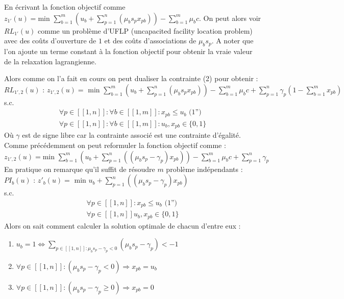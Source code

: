 \documentclass{article}
\begin{document}
En écrivant la fonction objectif comme  $z_{1'}(u) = \text{min } \sum \limits_{b = 1}^{m}( u_b + \sum \limits_{p = 1}^n (\mu_b s_p x_{pb})) - \sum \limits_{b = 1}^{m} \mu_b c$. On peut alors voir $RL_{1'}(u)$ comme un problème d'UFLP (uncapacited facility location problem) avec des coûts d'ouverture de $1$ et des coûts d'associations de $\mu_b s_p$. A noter que l'on ajoute un terme constant à la fonction objectif pour obtenir la vraie valeur de la relaxation lagrangienne.

Alors comme on l'a fait en cours on peut dualiser la contrainte (2) pour obtenir :\\
$RL_{1',2}(u) \text{ : } z_{1',2}(u) = \text{ min } \sum \limits_{b = 1}^{m}( u_b + \sum \limits_{p = 1}^n (\mu_b s_p x_{pb})) - \sum \limits_{b = 1}^{m} \mu_b c + \sum \limits_{p = 1}^n \gamma_p (1 - \sum \limits_{b = 1}^m x_{pb})$\\
s.c.
\begin{align*}
 \forall p \in [\![ 1 , n ]\!] : \forall b \in [\![ 1 , m ]\!] : x_{pb} \leqslant u_b \text{ (1'')}\\
 \forall p \in [\![ 1 , n ]\!] : \forall b \in [\![ 1 , m ]\!] : u_b , x_{pb} \in \{0,1\}
\end{align*}
Où $\gamma$ est de signe libre car la contrainte associé est une contrainte d'égalité.\\
Comme précédemment on peut reformuler la fonction objectif comme : \\
$z_{1',2}(u) = \text{min } \sum \limits_{b = 1}^{m}( u_b + \sum \limits_{p = 1}^n ((\mu_b s_p - \gamma_p) x_{pb})) - \sum \limits_{b = 1}^{m} \mu_b c + \sum \limits_{p = 1}^{n} \gamma_p$\\
En pratique on remarque qu'il suffit de résoudre $m$ problème indépendants :\\
$PI_{b}(u) \text{ : } z'_{b}(u) = \text{ min } u_b + \sum \limits_{p = 1}^n ((\mu_b s_p - \gamma_p) x_{pb})$\\
s.c.
\begin{align*}
 \forall p \in [\![ 1 , n ]\!] : x_{pb} \leqslant u_b \text{ (1'')}\\
 \forall p \in [\![ 1 , n ]\!] u_b , x_{pb} \in \{0,1\}
\end{align*}
Alors on sait comment calculer la solution optimale de chacun d'entre eux :
\begin{enumerate}[1 - ]
\item
$u_b = 1 \Leftrightarrow \sum \limits_{ p \in [\![ 1 , n ]\!] : \mu_b s_p - \gamma_p < 0} (\mu_b s_p - \gamma_p) < -1$
\item
$\forall p \in [\![ 1 , n ]\!] : (\mu_b s_p - \gamma_p < 0) \Rightarrow x_{pb} = u_b$
\item
$\forall p \in [\![ 1 , n ]\!] : (\mu_b s_p - \gamma_p \geqslant 0) \Rightarrow x_{pb} = 0$
\end{enumerate}
\end{document}
